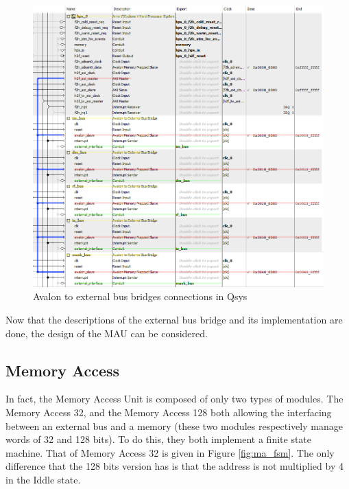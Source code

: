 \begin{figure}[ht!]
    \center
    \includegraphics[width=\linewidth]{"Chapter5-MAU_CTRLU/res/qsys_mau.PNG"}
    \caption{Avalon to external bus bridges connections in Qsys}
    \label{fig:avalon/bus}
\end{figure}

Now that the descriptions of the external bus bridge and its implementation are done, the design of 
the MAU can be considered.

\subsection{Memory Access}

In fact, the Memory Access Unit is composed of only two types of modules. The Memory Access 32, and 
the Memory Access 128 both allowing the interfacing between an external bus and a memory (these two
modules respectively manage words of 32 and 128 bits). To do this, they both implement a finite state machine. 
That of Memory Access 32 is given in Figure \ref{fig:ma_fsm}. The only difference that the 128 bits version 
has is that the address is not multiplied by 4 in the Iddle state. 

